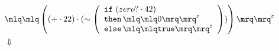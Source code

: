 \documentclass{article}
\begin{document}
\tiny\begin{align*}
&\quot{\left(\left(+\cdot 22\right)\cdot (\sim \left(\begin{array}{l}\mathtt{if}\,\left(zero?\cdot 42\right)\\\mathtt{then}\,\quot{0}^{\varepsilon}\\\mathtt{else}\,\quot{\mathtt{true}}^{\varepsilon}\end{array}\right))\right)}^{\varepsilon}\\ 
&\Downarrow\\ 
\end{align*}
\end{document}
